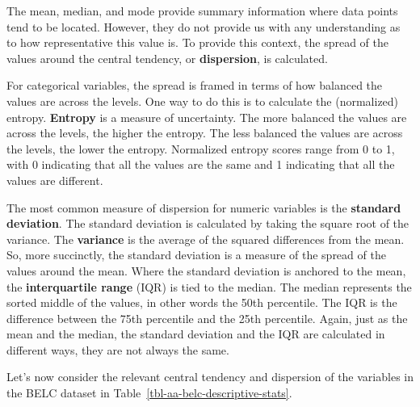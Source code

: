 \documentclass[
  letterpaper,
  DIV=11,
  numbers=noendperiod]{scrreport}
\theoremstyle{definition}
\theoremstyle{remark}
\begin{document}
The mean, median, and mode provide summary information where data points
tend to be located. However, they do not provide us with any
understanding as to how representative this value is. To provide this
context, the spread of the values around the central tendency, or
\textbf{dispersion}, is calculated.

For categorical variables, the spread is framed in terms of how balanced
the values are across the levels. One way to do this is to calculate the
(normalized) entropy. \textbf{Entropy} is a measure of uncertainty. The
more balanced the values are across the levels, the higher the entropy.
The less balanced the values are across the levels, the lower the
entropy. Normalized entropy scores range from 0 to 1, with 0 indicating
that all the values are the same and 1 indicating that all the values
are different.

The most common measure of dispersion for numeric variables is the
\textbf{standard deviation}. The standard deviation is calculated by
taking the square root of the variance. The \textbf{variance} is the
average of the squared differences from the mean. So, more succinctly,
the standard deviation is a measure of the spread of the values around
the mean. Where the standard deviation is anchored to the mean, the
\textbf{interquartile range} (IQR) is tied to the median. The median
represents the sorted middle of the values, in other words the 50th
percentile. The IQR is the difference between the 75th percentile and
the 25th percentile. Again, just as the mean and the median, the
standard deviation and the IQR are calculated in different ways, they
are not always the same.

Let's now consider the relevant central tendency and dispersion of the
variables in the BELC dataset in
Table~\ref{tbl-aa-belc-descriptive-stats}.
\end{document}
